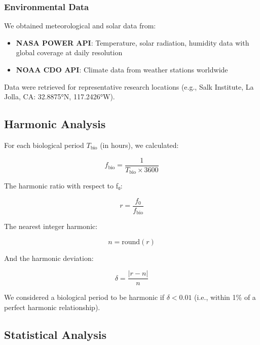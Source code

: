 \documentclass[11pt,a4paper]{article}
\begin{document}
\subsubsection{Environmental Data}

We obtained meteorological and solar data from:

\begin{itemize}
    \item \textbf{NASA POWER API}: Temperature, solar radiation, humidity data with global coverage at daily resolution \citep{nasa_power}
    \item \textbf{NOAA CDO API}: Climate data from weather stations worldwide \citep{noaa_cdo}
\end{itemize}

Data were retrieved for representative research locations (e.g., Salk Institute, La Jolla, CA: 32.8875°N, 117.2426°W).

\subsection{Harmonic Analysis}

For each biological period $T_{\text{bio}}$ (in hours), we calculated:

\begin{equation}
f_{\text{bio}} = \frac{1}{T_{\text{bio}} \times 3600}
\end{equation}

The harmonic ratio with respect to f₀:

\begin{equation}
r = \frac{f_0}{f_{\text{bio}}}
\end{equation}

The nearest integer harmonic:

\begin{equation}
n = \text{round}(r)
\end{equation}

And the harmonic deviation:

\begin{equation}
\delta = \frac{|r - n|}{n}
\end{equation}

We considered a biological period to be harmonic if $\delta < 0.01$ (i.e., within 1\% of a perfect harmonic relationship).

\subsection{Statistical Analysis}
\end{document}
